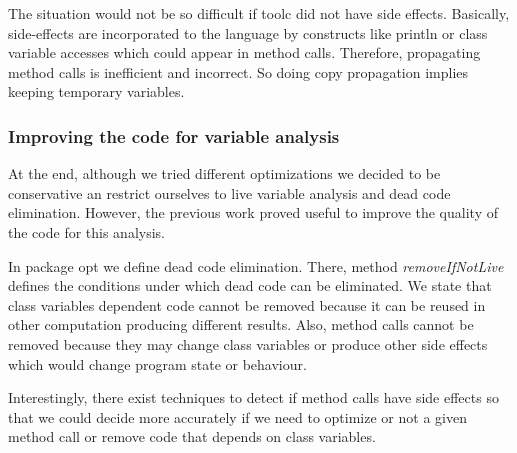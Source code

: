 The situation would not be so difficult if toolc did not have side effects. Basically, side-effects are incorporated to the language by constructs like println or class variable accesses which could appear in method calls. Therefore, propagating method calls is inefficient and incorrect. So doing copy propagation implies keeping temporary variables. 

\subsubsection{Improving the code for variable analysis}

At the end, although we tried different optimizations we decided to be conservative an restrict ourselves to live variable analysis and dead code elimination. However, the previous work proved useful to improve the quality of the code for this analysis. 

In package opt we define dead code elimination. There, method \emph{removeIfNotLive} defines the conditions under which dead code can be eliminated. We state that class variables dependent code cannot be removed because it can be reused in other computation producing different results. Also, method calls cannot be removed because they may change class variables or produce other side effects which would change program state or behaviour. 

Interestingly, there exist \cite{SideEffects} techniques to detect if method calls have side effects so that we could decide more accurately if we need to optimize or not a given method call or remove code that depends on class variables. 

